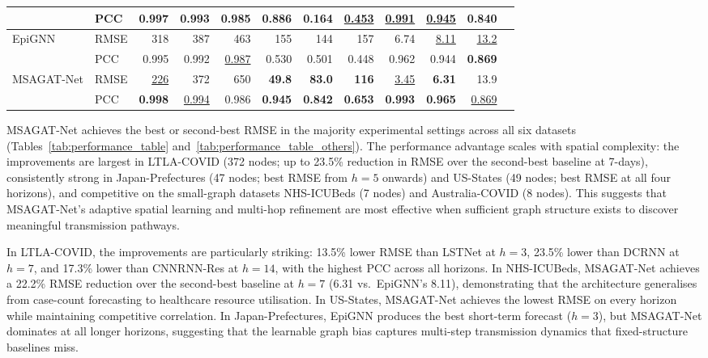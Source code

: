 \documentclass[final,1p,times]{elsarticle}
\begin{document}
\begin{table}[!ht]
{\begin{tabular}{llrrrrrrrrrr}
                    & PCC  & 0.997 & 0.993 & 0.985 & 0.886 & 0.164 & \underline{0.453} & \underline{0.991} & \underline{0.945} & 0.840 \\
        \midrule
        EpiGNN      & RMSE & 318 & 387 & 463 & 155 & 144 & 157 & 6.74 & \underline{8.11} & \underline{13.2} \\
                    & PCC  & 0.995 & 0.992 & \underline{0.987} & 0.530 & 0.501 & 0.448 & 0.962 & 0.944 & \textbf{0.869} \\
        \midrule
        MSAGAT-Net & RMSE & \underline{226} & 372 & 650 & \textbf{49.8} & \textbf{83.0} & \textbf{116} & \underline{3.45} & \textbf{6.31} & 13.9 \\
                    & PCC  & \textbf{0.998} & \underline{0.994} & 0.986 & \textbf{0.945} & \textbf{0.842} & \textbf{0.653} & \textbf{0.993} & \textbf{0.965} & \underline{0.869} \\
        \bottomrule
    \end{tabular}%
    }
\end{table}
MSAGAT-Net achieves the best or second-best RMSE in the majority experimental settings across all six datasets (Tables~\ref{tab:performance_table} and~\ref{tab:performance_table_others}). The performance advantage scales with spatial complexity: the improvements are largest in LTLA-COVID (372 nodes; up to 23.5\% reduction in RMSE over the second-best baseline at 7-days), consistently strong in Japan-Prefectures (47 nodes; best RMSE from $h{=}5$ onwards) and US-States (49 nodes; best RMSE at all four horizons), and competitive on the small-graph datasets NHS-ICUBeds (7 nodes) and Australia-COVID (8 nodes). This suggests that MSAGAT-Net's adaptive spatial learning and multi-hop refinement are most effective when sufficient graph structure exists to discover meaningful transmission pathways.

In LTLA-COVID, the improvements are particularly striking: 13.5\% lower RMSE than LSTNet at $h{=}3$, 23.5\% lower than DCRNN at $h{=}7$, and 17.3\% lower than CNNRNN-Res at $h{=}14$, with the highest PCC across all horizons. In NHS-ICUBeds, MSAGAT-Net achieves a 22.2\% RMSE reduction over the second-best baseline at $h{=}7$ (6.31 vs.\ EpiGNN's 8.11), demonstrating that the architecture generalises from case-count forecasting to healthcare resource utilisation. In US-States, MSAGAT-Net achieves the lowest RMSE on every horizon while maintaining competitive correlation. In Japan-Prefectures, EpiGNN produces the best short-term forecast ($h{=}3$), but MSAGAT-Net dominates at all longer horizons, suggesting that the learnable graph bias captures multi-step transmission dynamics that fixed-structure baselines miss.
\end{document}
